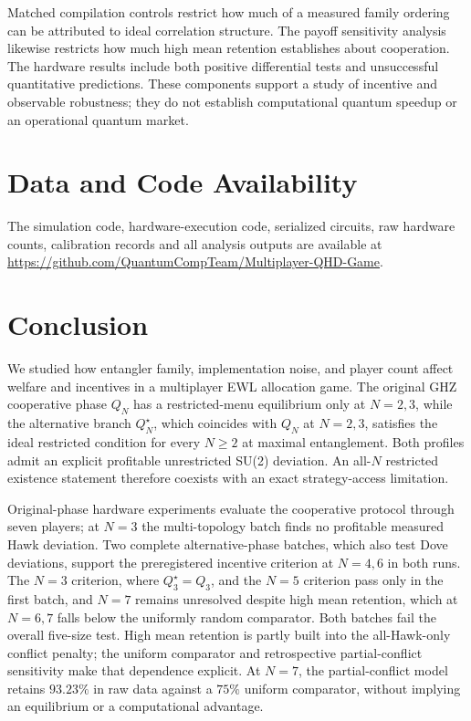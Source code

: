\documentclass[conference,letterpaper,10pt]{IEEEtran}
\begin{document}
Matched compilation controls restrict how much of a measured family ordering
can be attributed to ideal correlation structure. The payoff sensitivity
analysis likewise restricts how much high mean retention establishes about
cooperation. The hardware results include both positive differential tests
and unsuccessful quantitative predictions. These components support
a study of incentive and observable robustness; they do not establish
computational quantum speedup or an operational quantum market.

\section*{Data and Code Availability}
The simulation code, hardware-execution code, serialized circuits, raw
hardware counts, calibration records and all analysis outputs are available
at \url{https://github.com/QuantumCompTeam/Multiplayer-QHD-Game}.

\section{Conclusion}\label{sec:conclusion}
We studied how entangler family, implementation noise, and player count
affect welfare and incentives in a multiplayer EWL allocation game. The
original GHZ cooperative phase $Q_N$ has a restricted-menu equilibrium only
at $N=2,3$, while the alternative branch $Q_N^\star$, which coincides with
$Q_N$ at $N=2,3$, satisfies the ideal restricted condition for every $N\ge2$
at maximal entanglement. Both
profiles admit an explicit profitable unrestricted SU(2) deviation.
An all-$N$ restricted existence statement therefore coexists with an
exact strategy-access limitation.

Original-phase hardware experiments evaluate the cooperative protocol
through seven players; at $N=3$ the multi-topology batch finds no profitable
measured Hawk deviation. Two complete alternative-phase batches, which also
test Dove deviations, support the preregistered incentive criterion at $N=4,6$
in both runs. The $N=3$ criterion, where $Q_3^\star=Q_3$, and the $N=5$
criterion pass only in the first batch, and $N=7$ remains unresolved despite
high mean retention, which at $N=6,7$ falls below the uniformly random
comparator. Both batches fail the overall five-size test.
High mean retention is partly built into the
all-Hawk-only conflict penalty; the uniform comparator and retrospective
partial-conflict sensitivity make that dependence explicit. At $N=7$,
the partial-conflict model retains $93.23\%$ in raw data against a $75\%$
uniform comparator, without implying an equilibrium or a computational advantage.
\end{document}
